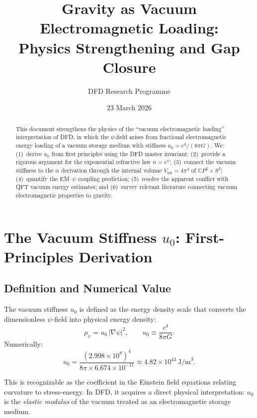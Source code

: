 \documentclass[11pt]{article}
\title{Gravity as Vacuum Electromagnetic Loading:\\
  Physics Strengthening and Gap Closure}
\author{DFD Research Programme}
\date{23 March 2026}
\newcommand{\CP}{\mathbb{C}P}
\newcommand{\Vint}{V_{\mathrm{int}}}
\theoremstyle{plain}
\theoremstyle{definition}
\theoremstyle{remark}
\begin{document}
\maketitle

\begin{abstract}
This document strengthens the physics of the ``vacuum electromagnetic loading''
interpretation of DFD, in which the $\psi$-field arises from fractional
electromagnetic energy loading of a vacuum storage medium with stiffness
$u_0 = c^4/(8\pi G)$. We: (1)~derive $u_0$ from first principles using the
DFD master invariant; (2)~provide a rigorous argument for the exponential
refractive law $n = e^\psi$; (3)~connect the vacuum stiffness to the
$\alpha$ derivation through the internal volume $\Vint = 4\pi^4$ of
$\CP^2 \times S^3$; (4)~quantify the EM--$\psi$ coupling prediction;
(5)~resolve the apparent conflict with QFT vacuum energy estimates; and
(6)~survey relevant literature connecting vacuum electromagnetic properties
to gravity.
\end{abstract}

\tableofcontents

\section{The Vacuum Stiffness $u_0$: First-Principles Derivation}
\label{sec:u0-derivation}

\subsection{Definition and Numerical Value}

The vacuum stiffness $u_0$ is defined as the energy density scale that
converts the dimensionless $\psi$-field into physical energy density:
\begin{equation}
\rho_\psi = u_0\,|\nabla\psi|^2, \qquad
u_0 \equiv \frac{c^4}{8\pi G}.
\label{eq:u0-def}
\end{equation}
Numerically:
\begin{equation}
u_0 = \frac{(2.998 \times 10^8)^4}{8\pi \times 6.674 \times 10^{-11}}
\approx 4.82 \times 10^{43}~\text{J/m}^3.
\end{equation}

This is recognizable as the coefficient in the Einstein field equations
relating curvature to stress-energy. In DFD, it acquires a direct physical
interpretation: $u_0$ is the \emph{elastic modulus} of the vacuum treated
as an electromagnetic storage medium.
\end{document}
